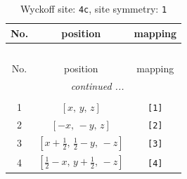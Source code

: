 \documentclass[fleqn,8pt]{jsarticle}
\begin{document}
\begin{longtable}{ccc}
\caption{Wyckoff site: {\tt 4c}, site symmetry: {\tt 1}}
 \\
 \hline \hline
No. & position & mapping \\ \hline \endfirsthead

\multicolumn{2}{l}{\tablename\ \thetable{}} \\
 \hline \hline
No. & position & mapping \\ \hline \endhead

 \hline \hline
\multicolumn{2}{r}{\footnotesize\it continued ...} \\ \endfoot

 \hline \hline
\multicolumn{2}{r}{} \\ \endlastfoot

1 & $\left[ x,\, y,\, z \right]$ & {\tt [1]} \\ \hline
2 & $\left[ - x,\, - y,\, z \right]$ & {\tt [2]} \\ \hline
3 & $\left[ x + \frac{1}{2},\, \frac{1}{2} - y,\, - z \right]$ & {\tt [3]} \\ \hline
4 & $\left[ \frac{1}{2} - x,\, y + \frac{1}{2},\, - z \right]$ & {\tt [4]} \\
\end{longtable}
\end{document}
